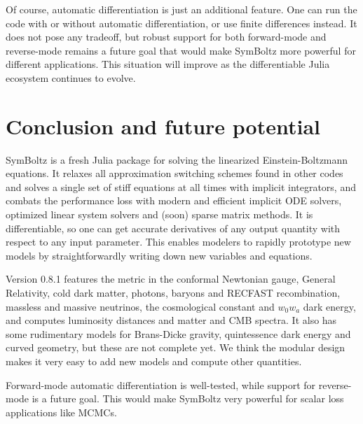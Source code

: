 \documentclass{aa}
\newcommand\TODO[1]{\textcolor{red}{(\textbf{TODO:} #1)}}
\begin{document}
Of course, automatic differentiation is just an additional feature.
One can run the code with or without automatic differentiation, or use finite differences instead.
It does not pose any tradeoff, but robust support for both forward-mode and reverse-mode remains a future goal that would make SymBoltz more powerful for different applications.
This situation will improve as the differentiable Julia ecosystem continues to evolve.

\iffalse
\TODO{Optimal Jacobian Accumulation (OJA); show computational graph for a Boltzmann code; what is the best Jacobian strategy for a Boltzmann code through the ODE integrations?}
The bottleneck for automatic differentiation in a cosmology code is differentiating the background ODE and particularly the perturbation ODE for every wavenumber $k$.
The main drawback of forward-mode is that it will effectively repeat the background and perturbation ODEs for every input parameter.
Can this be avoided with reverse-mode?
\fi

\section{Conclusion and future potential}
\label{sec:conclusion}

SymBoltz is a fresh Julia package for solving the linearized Einstein-Boltzmann equations.
It relaxes all approximation switching schemes found in other codes and solves a single set of stiff equations at all times with implicit integrators, and combats the performance loss with modern and efficient implicit ODE solvers, optimized linear system solvers and (soon) sparse matrix methods.
It is differentiable, so one can get accurate derivatives of any output quantity with respect to any input parameter.
This enables modelers to rapidly prototype new models by straightforwardly writing down new variables and equations.

Version 0.8.1 features the metric in the conformal Newtonian gauge, General Relativity, cold dark matter, photons, baryons and RECFAST recombination, massless and massive neutrinos, the cosmological constant and $w_0 w_a$ dark energy, and computes luminosity distances and matter and CMB spectra.
It also has some rudimentary models for Brans-Dicke gravity, quintessence dark energy and curved geometry, but these are not complete yet.
We think the modular design makes it very easy to add new models and compute other quantities.

Forward-mode automatic differentiation is well-tested, while support for reverse-mode is a future goal.
This would make SymBoltz very powerful for scalar loss applications like MCMCs.
\end{document}

